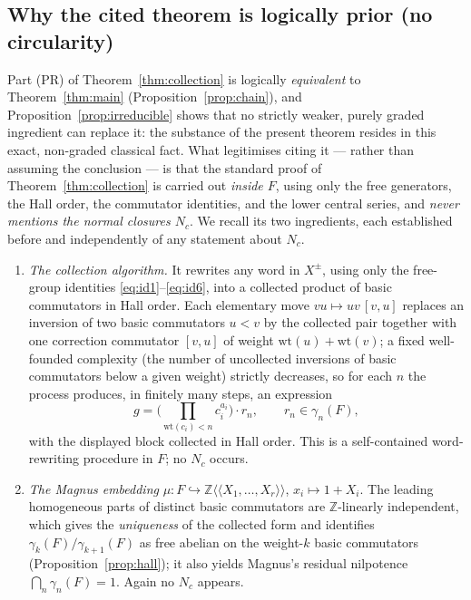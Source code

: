 \documentclass{amsart}
\theoremstyle{definition}
\theoremstyle{remark}
\begin{document}
\subsection*{Why the cited theorem is logically prior (no circularity)}

Part (PR) of Theorem~\ref{thm:collection} is logically \emph{equivalent} to
Theorem~\ref{thm:main} (Proposition~\ref{prop:chain}), and Proposition~\ref{prop:irreducible}
shows that no strictly weaker, purely graded ingredient can replace it: the substance of the
present theorem resides in this exact, non-graded classical fact. What legitimises citing it ---
rather than assuming the conclusion --- is that the standard proof of Theorem~\ref{thm:collection}
is carried out \emph{inside $F$}, using only the free generators, the Hall order, the commutator
identities, and the lower central series, and \emph{never mentions the normal closures $N_c$}.
We recall its two ingredients, each established before and independently of any statement about
$N_c$.

\begin{enumerate}
\item[(i)] \emph{The collection algorithm.} It rewrites any word in $X^{\pm}$, using only the
free-group identities \eqref{eq:id1}--\eqref{eq:id6}, into a collected product of basic
commutators in Hall order. Each elementary move $vu\mapsto uv\,[v,u]$ replaces an inversion of
two basic commutators $u<v$ by the collected pair together with one correction commutator
$[v,u]$ of weight $\mathrm{wt}(u)+\mathrm{wt}(v)$; a fixed well-founded complexity (the number
of uncollected inversions of basic commutators below a given weight) strictly decreases, so for
each $n$ the process produces, in finitely many steps, an expression
\[
g=\Big(\textstyle\prod_{\mathrm{wt}(c_i)<n} c_i^{a_i}\Big)\cdot r_n ,
\qquad r_n\in\gamma_n(F),
\]
with the displayed block collected in Hall order. This is a self-contained word-rewriting
procedure in $F$; no $N_c$ occurs.
\item[(ii)] \emph{The Magnus embedding} $\mu\colon F\hookrightarrow\mathbb Z\langle\!\langle
X_1,\dots,X_r\rangle\!\rangle$, $x_i\mapsto1+X_i$. The leading homogeneous parts of distinct
basic commutators are $\mathbb Z$-linearly independent, which gives the \emph{uniqueness} of the
collected form and identifies $\gamma_k(F)/\gamma_{k+1}(F)$ as free abelian on the weight-$k$
basic commutators (Proposition~\ref{prop:hall}); it also yields Magnus's residual nilpotence
$\bigcap_n\gamma_n(F)=1$. Again no $N_c$ appears.
\end{enumerate}
\end{document}
